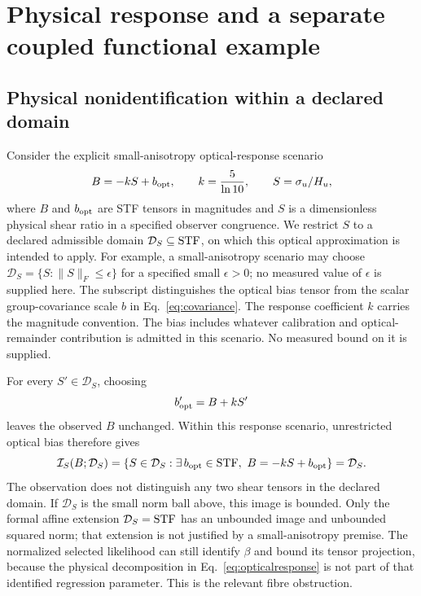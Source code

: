 \section{Physical response and a separate coupled functional example}
\label{sec:coupled}

\subsection{Physical nonidentification within a declared domain}

Consider the explicit small-anisotropy optical-response scenario
\begin{equation}
 B=-kS+b_{\rm opt},\qquad k=\frac{5}{\ln10},\qquad
 S=\sigma_u/H_u,
 \label{eq:opticalresponse}
\end{equation}
where $B$ and $b_{\rm opt}$ are STF tensors in magnitudes and $S$ is a dimensionless physical shear ratio in a specified observer congruence. We restrict $S$ to a declared admissible domain $\mathcal D_S\subseteq\mathrm{STF}$, on which this optical approximation is intended to apply. For example, a small-anisotropy scenario may choose $\mathcal D_S=\{S:\|S\|_F\leq\epsilon\}$ for a specified small $\epsilon>0$; no measured value of $\epsilon$ is supplied here. The subscript distinguishes the optical bias tensor from the scalar group-covariance scale $b$ in Eq.~\eqref{eq:covariance}. The response coefficient $k$ carries the magnitude convention. The bias includes whatever calibration and optical-remainder contribution is admitted in this scenario. No measured bound on it is supplied.

For every $S'\in\mathcal D_S$, choosing
\begin{equation}
 b'_{\rm opt}=B+kS'
 \label{eq:biaswitness}
\end{equation}
leaves the observed $B$ unchanged. Within this response scenario, unrestricted optical bias therefore gives
\begin{equation}
 \mathcal I_S(B;\mathcal D_S)
 =\{S\in\mathcal D_S:\exists\,b_{\rm opt}\in\mathrm{STF},\ B=-kS+b_{\rm opt}\}
 =\mathcal D_S.
 \label{eq:admissibleshear}
\end{equation}
The observation does not distinguish any two shear tensors in the declared domain. If $\mathcal D_S$ is the small norm ball above, this image is bounded. Only the formal affine extension $\mathcal D_S=\mathrm{STF}$ has an unbounded image and unbounded squared norm; that extension is not justified by a small-anisotropy premise. The normalized selected likelihood can still identify $\beta$ and bound its tensor projection, because the physical decomposition in Eq.~\eqref{eq:opticalresponse} is not part of that identified regression parameter. This is the relevant fibre obstruction.

